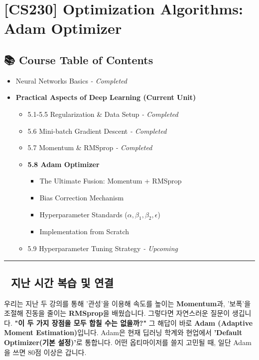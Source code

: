 \documentclass[11pt,a4paper]{book}
\theoremstyle{definition}
\begin{document}
\chapter{[CS230] Optimization Algorithms: \\ Adam Optimizer}
\label{ch:lecture18}

\section*{📚 Course Table of Contents}
\begin{itemize}
    \item[Chapter 1-4.] Neural Networks Basics \textit{- Completed}
    \item[\textbf{Chapter 5.}] \textbf{Practical Aspects of Deep Learning (Current Unit)}
    \begin{itemize}
        \item 5.1-5.5 Regularization \& Data Setup \textit{- Completed}
        \item 5.6 Mini-batch Gradient Descent \textit{- Completed}
        \item 5.7 Momentum \& RMSprop \textit{- Completed}
        \item \textbf{5.8 Adam Optimizer}
        \begin{itemize}
            \item The Ultimate Fusion: Momentum + RMSprop
            \item Bias Correction Mechanism
            \item Hyperparameter Standards ($\alpha, \beta_1, \beta_2, \epsilon$)
            \item Implementation from Scratch
        \end{itemize}
        \item 5.9 Hyperparameter Tuning Strategy \textit{- Upcoming}
    \end{itemize}
\end{itemize}

\vspace{0.5cm}
\hrule
\vspace{0.5cm}

\section*{🔗 지난 시간 복습 및 연결}
우리는 지난 두 강의를 통해 '관성'을 이용해 속도를 높이는 \textbf{Momentum}과, '보폭'을 조절해 진동을 줄이는 \textbf{RMSprop}을 배웠습니다.
그렇다면 자연스러운 질문이 생깁니다. \textbf{"이 두 가지 장점을 모두 합칠 수는 없을까?"}
그 해답이 바로 \textbf{Adam (Adaptive Moment Estimation)}입니다. Adam은 현재 딥러닝 학계와 현업에서 \textbf{'Default Optimizer(기본 설정)'}로 통합니다. 어떤 옵티마이저를 쓸지 고민될 때, 일단 Adam을 쓰면 80점 이상은 갑니다.
\end{document}
